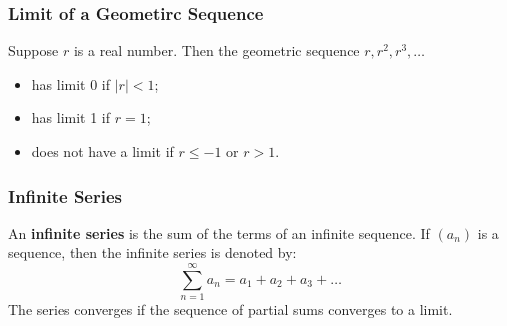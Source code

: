 \begin{frame}
\frametitle{Limit of a Geometirc Sequence}
\begin{definition}
    Suppose \(r\) is a real number. Then the geometric sequence \(r, r^2, r^3, \ldots\)
    \begin{itemize}
        \item has limit 0 if \(|r| < 1\);
        \item has limit 1 if \(r = 1\);
        \item does not have a limit if \(r \leq -1\) or \(r > 1\).
    \end{itemize}
\end{definition}
\end{frame}

\begin{frame}
    \frametitle{Infinite Series}
    An \textbf{infinite series} is the sum of the terms of an infinite sequence. If \((a_n)\) is a sequence, then the infinite series is denoted by:
    \[
    \sum_{n=1}^{\infty} a_n = a_1 + a_2 + a_3 + \ldots
    \]
    The series converges if the sequence of partial sums converges to a limit.
\end{frame}
